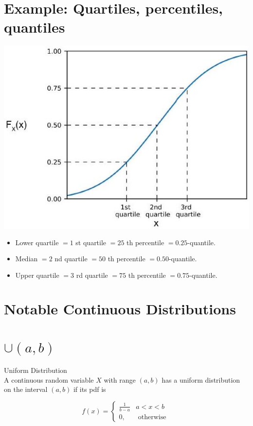 \documentclass[10pt]{article}
\begin{document}
\section*{Example: Quartiles, percentiles, quantiles}
\begin{center}
\includegraphics[max width=\textwidth]{2025_05_11_1201cfe24e14b364b4ecg-16}
\end{center}

\begin{itemize}
  \item Lower quartile $=1$ st quartile $=25$ th percentile $=0.25$-quantile.
  \item Median $=2$ nd quartile $=50$ th percentile $=0.50$-quantile.
  \item Upper quartile $=3$ rd quartile $=75$ th percentile $=0.75$-quantile.
\end{itemize}

\section*{Notable Continuous Distributions}
\section*{$\cup(a, b)$}
Uniform Distribution\\
A continuous random variable $X$ with range $(a, b)$ has a uniform distribution on the interval $(a, b)$ if its pdf is

$$
f(x)= \begin{cases}\frac{1}{b-a} & a<x<b \\ 0, & \text { otherwise }\end{cases}
$$
\end{document}

